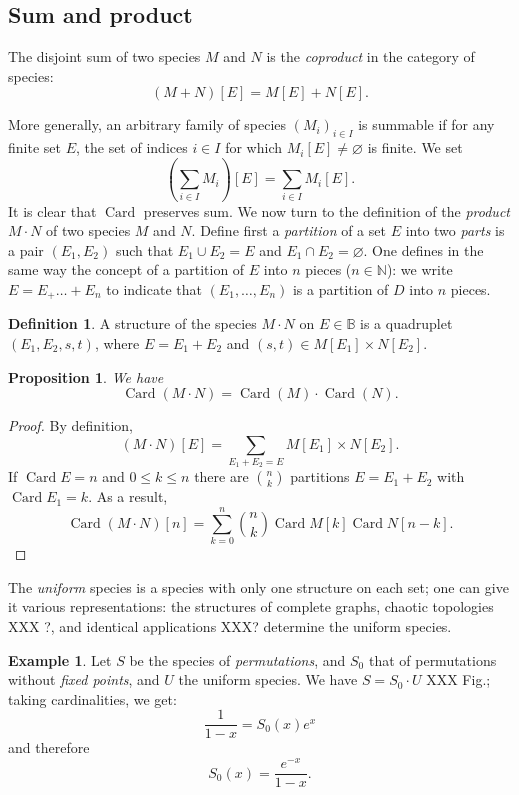 \documentclass{article}
\newtheorem{prop}[thm]{Proposition}
\theoremstyle{definition}
\newtheorem{defn}[thm]{Definition}
\newtheorem{ex}{Example}
\theoremstyle{remark}
\newcommand{\B}{\mathbb{B}}
\newcommand{\N}{\mathbb{N}}
\DeclareMathOperator{\Card}{Card}
\newcommand{\term}[1]{\emph{#1}}
\newcommand{\union}{\cup}
\newcommand{\intersect}{\cap}
\begin{document}
\subsection{Sum and product}

The disjoint sum of two species $M$ and $N$ is the \emph{coproduct}
in the category of species:
\[ (M + N) [E] = M [E] + N [E]. \]

More generally, an arbitrary family of species $(M_i)_{i \in I}$ is
summable if for any finite set $E$, the set of indices $i \in I$ for
which $M_i[E] \neq \varnothing$ is finite.  We set
\[ \left( \sum_{i \in I} M_i \right) [ E ] = \sum_{i \in I} M_i[E]. \]
It is clear that $\Card$ preserves sum. We now turn to the definition
of the \term{product} $M \cdot N$ of two species $M$ and $N$. Define
first a \term{partition} of a set $E$ into two \term{parts} is a pair
$(E_1, E_2)$ such that $E_1 \union E_2 = E$ and $E_1 \intersect E_2 =
\varnothing$. One defines in the same way the concept of a partition
of $E$ into $n$ pieces ($n \in \N$): we write $E = E_ + \dots + E_n$
to indicate that $(E_1, \dots, E_n)$ is a partition of $D$ into $n$
pieces.

\begin{defn}
  A structure of the species $M \cdot N$ on $E \in \B$ is a quadruplet
  $(E_1, E_2, s, t)$, where $E = E_1 + E_2$ and $(s, t) \in M[E_1]
  \times N [E_2]$.
\end{defn}

\begin{prop}
We have
\[ \Card (M \cdot N) = \Card (M) \cdot \Card (N). \]
\end{prop}
\begin{proof}
By definition,
\[ (M \cdot N)[E] = \sum_{E_1 + E_2 = E} M[E_1] \times N[E_2]. \]
If $\Card E = n$ and $0 \leq k \leq n$ there are $\binom n k$
partitions $E = E_1 + E_2$ with $\Card E_1 = k$.  As a result,
\[ \Card(M \cdot N) [n] = \sum_{k=0}^n \binom n k \Card M [k] \Card N
[n - k]. \]
\end{proof}

The \term{uniform} species is a species with only one structure on each
set; one can give it various representations: the structures of
complete graphs, chaotic topologies XXX ?, and identical applications XXX? determine
the uniform species.

\begin{ex}
Let $S$ be the species of \term{permutations}, and $S_0$ that of
permutations without \emph{fixed points}, and $U$ the uniform species. We have $S = S_0 \cdot U$
XXX Fig.; taking cardinalities, we get:
\[ \frac{1}{1-x} = S_0 (x) e^x \]
and therefore
\[ S_0 (x) = \frac{e^{-x}}{1 - x}. \]
\end{ex}
\end{document}
